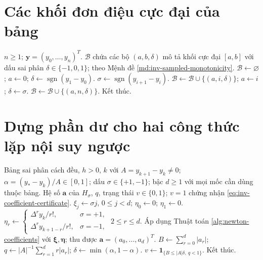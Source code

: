 \documentclass[12pt,a4paper,oneside]{book}
\numberwithin{algorithm}{chapter}
\theoremstyle{definition}
\begin{document}
\section{Các khối đơn điệu cực đại của bảng}
\begin{algorithm}[H]
\caption{Tách bảng theo dấu của sai phân cấp một}
\label{alg:inv-monotone-blocks}
\begin{algorithmic}[1]
\Require $n\geq1$; $\boldsymbol y=(y_0,\ldots,y_n)^T$.
\Ensure $\mathcal B$ chứa các bộ $(a,b,\delta)$ mô tả khối cực đại $[a,b]$ với dấu sai phân $\delta\in\{-1,0,1\}$; theo Mệnh đề \ref{md:inv-sampled-monotonicity}.
\State $\mathcal B\gets\varnothing$; $a\gets0$; $\delta\gets\operatorname{sgn}(y_1-y_0)$.
  \State $\sigma\gets\operatorname{sgn}(y_{i+1}-y_i)$.
  \If{$\sigma\ne\delta$}
    \State $\mathcal B\gets\mathcal B\cup\{(a,i,\delta)\}$; $a\gets i$; $\delta\gets\sigma$.
  \EndIf
  \Statex
\EndFor
\Statex
\State $\mathcal B\gets\mathcal B\cup\{(a,n,\delta)\}$.
\State Kết thúc.
\end{algorithmic}
\end{algorithm}

\section{Dựng phần dư cho hai công thức lặp nội suy ngược}
\begin{algorithm}[H]
\caption{Phần dư Newton tiến hoặc lùi và chứng nhận co -- sơ lược}
\label{alg:inv-remainder-certificate}
\begin{algorithmic}[1]
\Require Bảng sai phân cách đều, $h>0$, $k$ với $A=y_{k+1}-y_k\ne0$; $\alpha=(y_\ast-y_k)/A\in[0,1]$; dấu $\sigma\in\{+1,-1\}$; bậc $d\geq1$ với mọi mốc cần dùng thuộc bảng.
\Ensure Hệ số $\boldsymbol a$ của $H_\sigma$, $q$, trạng thái $v\in\{0,1\}$; $v=1$ chứng nhận \eqref{eq:inv-coefficient-certificate}.
\State $\xi_j\gets\sigma j$, $0\leq j<d$; $\eta_0\gets0$; $\eta_1\gets0$.
\State $\eta_r\gets\begin{cases}\Delta^ry_k/r!,&\sigma=+1,\\\Delta^ry_{k+1-r}/r!,&\sigma=-1,\end{cases}$ $2\leq r\leq d$.
\State Áp dụng Thuật toán \ref{alg:newton-coefficients} với $\boldsymbol\xi,\boldsymbol\eta$; thu được $\boldsymbol a=(a_0,\ldots,a_d)^T$.
\State $B\gets\sum_{r=0}^d|a_r|$; $q\gets|A|^{-1}\sum_{r=1}^dr|a_r|$; $\delta\gets\min(\alpha,1-\alpha)$.
\State $v\gets\mathbf1_{\{B\leq|A|\delta,\ q<1\}}$.
\State Kết thúc.
\end{algorithmic}
\end{algorithm}
\end{document}
